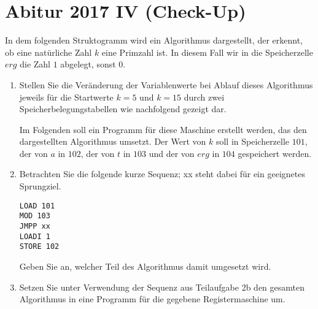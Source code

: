 \documentclass{lehramt-informatik-aufgabe}
\begin{document}

\section{Abitur 2017 IV (Check-Up)}

In dem folgenden Struktogramm wird ein Algorithmus dargestellt, der
erkennt, ob eine natürliche Zahl $k$ eine Primzahl ist. In diesem Fall
wir in die Speicherzelle $erg$ die Zahl $1$ abgelegt, sonst $0$.

\begin{enumerate}


\item Stellen Sie die Veränderung der Variablenwerte bei Ablauf dieses
Algorithmus jeweils für die Startwerte $k = 5$ und $k = 15$ durch zwei
Speicherbelegungstabellen wie nachfolgend gezeigt dar.

Im Folgenden soll ein Programm für diese Maschine erstellt werden, das
den dargestellten Algorithmus umsetzt. Der Wert von $k$ soll in
Speicherzelle $101$, der von $a$ in $102$, der von $t$ in $103$ und der
von $erg$ in $104$ gespeichert werden.


\item Betrachten Sie die folgende kurze Sequenz; xx steht dabei für ein
geeignetes Sprungziel.

\begin{verbatim}
LOAD 101
MOD 103
JMPP xx
LOADI 1
STORE 102
\end{verbatim}

Geben Sie an, welcher Teil des Algorithmus damit umgesetzt wird.


\item Setzen Sie unter Verwendung der Sequenz aus Teilaufgabe 2b den
gesamten Algorithmus in eine Programm für die gegebene Registermaschine
um.
\end{enumerate}
\end{document}
